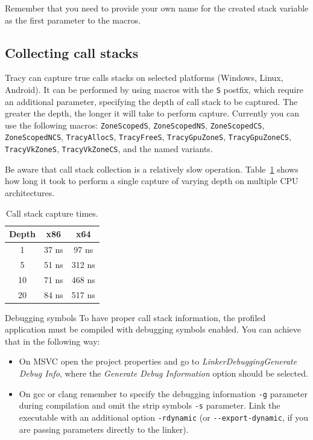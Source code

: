 \documentclass[hidelinks,titlepage,a4paper]{article}
\begin{document}
Remember that you need to provide your own name for the created stack variable as the first parameter to the macros.

\subsection{Collecting call stacks}
\label{collectingcallstacks}

Tracy can capture true calls stacks on selected platforms (Windows, Linux, Android). It can be performed by using macros with the \texttt{S} postfix, which require an additional parameter, specifying the depth of call stack to be captured. The greater the depth, the longer it will take to perform capture. Currently you can use the following macros: \texttt{ZoneScopedS}, \texttt{ZoneScopedNS}, \texttt{ZoneScopedCS}, \texttt{ZoneScopedNCS}, \texttt{TracyAllocS}, \texttt{TracyFreeS}, \texttt{TracyGpuZoneS}, \texttt{TracyGpuZoneCS}, \texttt{TracyVkZoneS}, \texttt{TracyVkZoneCS}, and the named variants.

Be aware that call stack collection is a relatively slow operation. Table~\ref{CallstackTimes} shows how long it took to perform a single capture of varying depth on multiple CPU architectures.

\begin{table}[h]
\centering
\begin{tabular}[h]{c|c|c}
\textbf{Depth} & \textbf{x86} & \textbf{x64} \\ \hline
1 & 37 \si{\nano\second} & 97 \si{\nano\second} \\
5 & 51 \si{\nano\second} & 312 \si{\nano\second} \\
10 & 71 \si{\nano\second} & 468 \si{\nano\second} \\
20 & 84 \si{\nano\second} & 517 \si{\nano\second}
\end{tabular}
\caption{Call stack capture times.}
\label{CallstackTimes}
\end{table}

\begin{bclogo}[
noborder=true,
couleur=black!5,
logo=\bcattention
]{Debugging symbols}
To have proper call stack information, the profiled application must be compiled with debugging symbols enabled. You can achieve that in the following way:

\begin{itemize}
\item On MSVC open the project properties and go to \emph{Linker\textrightarrow Debugging\textrightarrow Generate Debug Info}, where the \emph{Generate Debug Information} option should be selected.
\item On gcc or clang remember to specify the debugging information \texttt{-g} parameter during compilation and omit the strip symbols \texttt{-s} parameter. Link the executable with an additional option \texttt{-rdynamic} (or \texttt{-{}-export-dynamic}, if you are passing parameters directly to the linker).
\end{itemize}
\end{bclogo}
\end{document}
